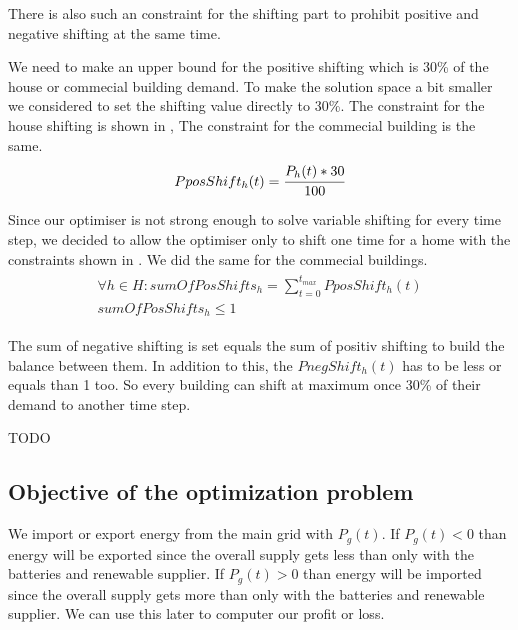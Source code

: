 There is also such an constraint for the shifting part to prohibit positive and negative shifting at the same time.

We need to make an upper bound for the positive shifting which is 30\% of the house or commecial building demand.
To make the solution space a bit smaller we considered to set the shifting value directly to 30\%.
The constraint for the house shifting is shown in ,
The constraint for the commecial building is the same.
\begin{align} \label{eq:shiftingUpperBound}
\begin{split}
PposShift_h(t) = \cfrac{P_{h}(t) * 30}{100}
\end{split}
\end{align}


Since our optimiser is not strong enough to solve variable shifting for every time step, we decided to allow the optimiser only to shift one time for a home with the constraints shown in .
We did the same for the commecial buildings.
\begin{align} \label{eq:numberOfShifts}
\begin{split}
\forall h \in H: sumOfPosShifts_{h} = \sum\limits_{t = 0}^{t_{max}} PposShift_h(t)\\
sumOfPosShifts_{h} \leq 1
\end{split}
\end{align}

The sum of negative shifting is set equals the sum of positiv shifting to build the balance between them.
In addition to this, the $PnegShift_h(t)$ has to be less or equals than 1 too.
So every building can shift at maximum once 30\% of their demand to another time step.


TODO

\subsection{Objective of the optimization problem}
We import or export energy from the main grid with $P_{g}(t)$.
If $P_{g}(t) < 0$ than energy will be exported since the overall supply gets less than only with the batteries and renewable supplier.
If $P_{g}(t) > 0$ than energy will be imported since the overall supply gets more than only with the batteries and renewable supplier.
We can use this later to computer our profit or loss.

